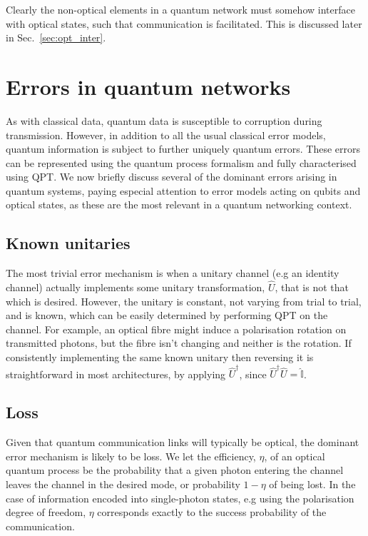 \documentclass[aps,rmp,twocolumn,amsmath,amssymb,nofootinbib,superscriptaddress,longbibliography,floatfix]{revtex4-1}
\begin{document}
Clearly the non-optical elements in a quantum network must somehow interface with optical states, such that communication is facilitated. This is discussed later in Sec.~\ref{sec:opt_inter}.

%
%

\section{Errors in quantum networks} \label{sec:errors_in_nets}

As with classical data, quantum data is susceptible to corruption during transmission. However, in addition to all the usual classical error models, quantum information is subject to further uniquely quantum errors. These errors can be represented using the quantum process formalism and fully characterised using QPT. We now briefly discuss several of the dominant errors arising in quantum systems, paying especial attention to error models acting on qubits and optical states, as these are the most relevant in a quantum networking context.

%
%

\subsection{Known unitaries}

The most trivial error mechanism is when a unitary channel (e.g an identity channel) actually implements some unitary transformation, $\hat{U}$, that is not that which is desired. However, the unitary is constant, not varying from trial to trial, and is known, which can be easily determined by performing QPT on the channel. For example, an optical fibre might induce a polarisation rotation on transmitted photons, but the fibre isn't changing and neither is the rotation. If consistently implementing the same known unitary then reversing it is straightforward in most architectures, by applying $\hat{U}^\dag$, since $\hat{U}^\dag\hat{U}=\hat{\mathbb{I}}$.

%
%

\subsection{Loss} \label{sec:eff_err}

Given that quantum communication links will typically be optical, the dominant error mechanism is likely to be loss. We let the efficiency, $\eta$, of an optical quantum process be the probability that a given photon entering the channel leaves the channel in the desired mode, or probability \mbox{$1-\eta$} of being lost. In the case of information encoded into single-photon states, e.g using the polarisation degree of freedom, $\eta$ corresponds exactly to the success probability of the communication.
\end{document}
